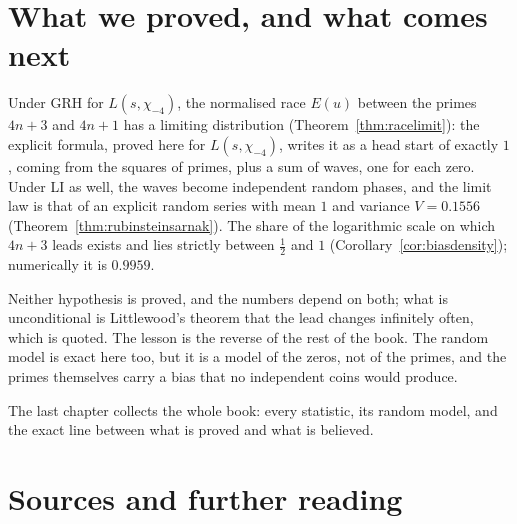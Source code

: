 \section{What we proved, and what comes next}

Under GRH for $L(s,\chi_{-4})$, the normalised race $E(u)$ between the primes $4n+3$ and $4n+1$ has a limiting distribution (Theorem~\ref{thm:racelimit}): the explicit formula, proved here for $L(s,\chi_{-4})$, writes it as a head start of exactly $1$, coming from the squares of primes, plus a sum of waves, one for each zero. Under LI as well, the waves become independent random phases, and the limit law is that of an explicit random series with mean $1$ and variance $V=0.1556$ (Theorem~\ref{thm:rubinsteinsarnak}). The share of the logarithmic scale on which $4n+3$ leads exists and lies strictly between $\frac12$ and $1$ (Corollary~\ref{cor:biasdensity}); numerically it is $0.9959$.

Neither hypothesis is proved, and the numbers depend on both; what is unconditional is Littlewood's theorem that the lead changes infinitely often, which is quoted. The lesson is the reverse of the rest of the book. The random model is exact here too, but it is a model of the zeros, not of the primes, and the primes themselves carry a bias that no independent coins would produce.

The last chapter collects the whole book: every statistic, its random model, and the exact line between what is proved and what is believed.

\section*{Sources and further reading}

